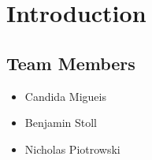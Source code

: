 \chapter{Introduction \\
\label{Introduction}}


\section{Team Members
\label{Section::Team Members}}

\begin{itemize}
\item Candida Migueis
\item Benjamin Stoll
\item Nicholas Piotrowski
\end{itemize}


\newpage


\newpage


\newpage


\newpage


\newpage


\newpage

